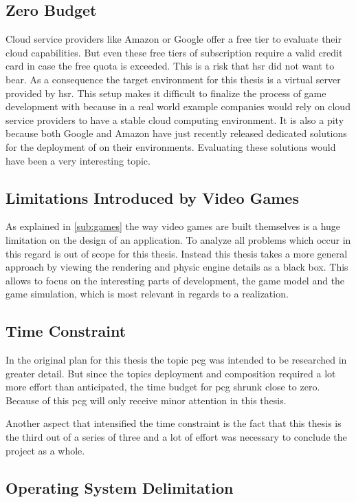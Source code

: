 \subsection{Zero Budget}
\label{sub:zero_buget}
Cloud service providers like Amazon or Google offer a free tier to evaluate
their cloud capabilities. But even these free tiers of subscription require a
valid credit card in case the free quota is exceeded. This is a risk that
\gls{hsr} did not want to bear. As a consequence the target environment for this
thesis is a virtual server provided by \gls{hsr}. This setup makes it difficult
to finalize the process of game development with \mss{} because in a real world
example companies would rely on cloud service providers to have a stable cloud
computing environment. It is also a pity because both Google and Amazon have
just recently released dedicated solutions for the deployment of \ogs{} on their
environments. Evaluating these solutions would have been a very interesting
topic.

\subsection{Limitations Introduced by Video Games}
As explained in \autoref{sub:games} the way video games are built themselves is
a huge limitation on the design of an \og{} application. To analyze all problems
which occur in this regard is out of scope for this thesis. Instead this thesis
takes a more general approach by viewing the rendering and physic engine
details as a black box. This allows to focus on the interesting parts of \og{}
development, the game model and the game simulation, which is most relevant in
regards to a \ms{} realization.

\subsection{Time Constraint}
In the original plan for this thesis the topic  \gls{pcg} was
intended to be researched in greater detail. But since the topics deployment and
composition required a lot more effort than anticipated, the time budget for
\gls{pcg} shrunk close to zero. Because of this \gls{pcg} will only receive
minor attention in this thesis.

Another aspect that intensified the time constraint is the fact that this thesis
is the third out of a series of three and a lot of effort was necessary to
conclude the project as a whole.

\subsection{Operating System Delimitation}
\label{sub:delimitations}

